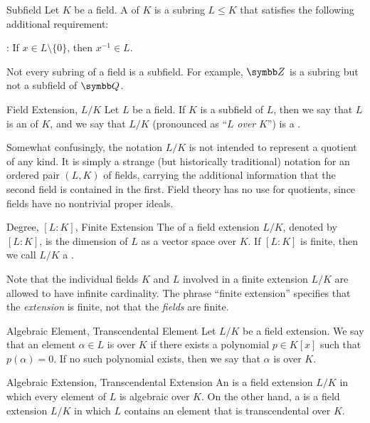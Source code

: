 \documentclass[12pt]{report}
\begin{document}
\begin{dfnbox}{Subfield}
	Let $K$ be a field. A  of $K$ is a subring $L \le K$ that satisfies the following additional requirement:
	\begin{dfnitems}
		\item {}: If $x \in L \setminus \{0\}$, then $x^{-1} \in L$.
	\end{dfnitems}
\end{dfnbox}

Not every subring of a field is a subfield. For example, $\Z$ is a subring but not a subfield of $\Q$.

\begin{dfnbox}{Field Extension, $L/K$}
	Let $L$ be a field. If $K$ is a subfield of $L$, then we say that $L$ is an  of $K$, and we say that $L/K$ (pronounced as ``$L$ \textit{over} $K$'') is a .
\end{dfnbox}

Somewhat confusingly, the notation $L/K$ is not intended to represent a quotient of any kind. It is simply a strange (but historically traditional) notation for an ordered pair $(L, K)$ of fields, carrying the additional information that the second field is contained in the first. Field theory has no use for quotients, since fields have no nontrivial proper ideals.

\begin{dfnbox}{Degree, $[L : K]$, Finite Extension}
	The  of a field extension $L/K$, denoted by $[L : K]$, is the dimension of $L$ as a vector space over $K$. If $[L : K]$ is finite, then we call $L/K$ a .
\end{dfnbox}

Note that the individual fields $K$ and $L$ involved in a finite extension $L/K$ are allowed to have infinite cardinality. The phrase ``finite extension'' specifies that the \textit{extension} is finite, not that the \textit{fields} are finite.

\begin{dfnbox}{Algebraic Element, Transcendental Element}
	Let $L/K$ be a field extension. We say that an element $\alpha \in L$ is  over $K$ if there exists a polynomial $p \in K[x]$ such that $p(\alpha) = 0$. If no such polynomial exists, then we say that $\alpha$ is  over $K$.
\end{dfnbox}

\begin{dfnbox}{Algebraic Extension, Transcendental Extension}
	An  is a field extension $L/K$ in which every element of $L$ is algebraic over $K$. On the other hand, a  is a field extension $L/K$ in which $L$ contains an element that is transcendental over $K$.
\end{dfnbox}
\end{document}
